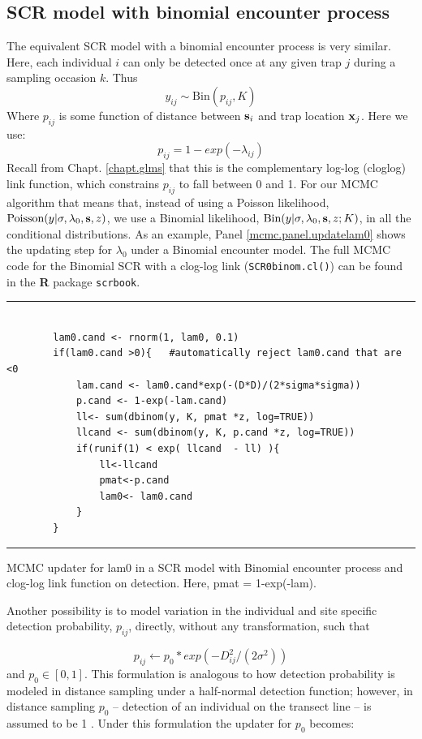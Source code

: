 \subsection{SCR model with binomial encounter process}
The equivalent SCR model with a binomial encounter process is very similar. Here, each individual $i$ can only be detected once at any given trap $j$ during a sampling occasion $k$.
Thus
\[
y_{ij} \sim \mbox{Bin} (p_{ij}, K)
\]
Where $p_{ij}$ is some function of distance between ${\bf s}_{i}$ and trap location ${\bf x}_{j}$. Here we use:
\[
p_{ij}=1-exp(-\lambda_{ij})
\]
Recall from Chapt. \ref{chapt.glms} that this is the complementary log-log (cloglog) link function, which constrains $p_{ij}$ 
to fall between 0 and 1.
For our MCMC algorithm that means that, instead of using a Poisson 
likelihood, $\mbox{Poisson}(y|\sigma,\lambda_0,{\bf s},z)$, we use a 
Binomial likelihood, $\mbox{Bin}(y| \sigma,\lambda_0,{\bf s},z; K)$, 
in all the conditional distributions. As an example, Panel
\ref{mcmc.panel.updatelam0} shows 
the updating step for $\lambda_0$ under a Binomial encounter model. 
The full MCMC code for the Binomial SCR with a clog-log link (\mbox{\tt SCR0binom.cl()}) 
can be found in the {\bf R} package \mbox{\tt scrbook}.


\begin{panel}[htp]
\centering
\rule[0.15in]{\textwidth}{.03in}
{\small
\begin{verbatim}

        lam0.cand <- rnorm(1, lam0, 0.1)
        if(lam0.cand >0){   #automatically reject lam0.cand that are <0
            lam.cand <- lam0.cand*exp(-(D*D)/(2*sigma*sigma))
            p.cand <- 1-exp(-lam.cand)
            ll<- sum(dbinom(y, K, pmat *z, log=TRUE))  
            llcand <- sum(dbinom(y, K, p.cand *z, log=TRUE))
            if(runif(1) < exp( llcand  - ll) ){
                ll<-llcand
                pmat<-p.cand
                lam0<- lam0.cand
            }
        }
\end{verbatim}
}
\rule[-0.15in]{\textwidth}{.03in}
\caption{
MCMC updater for lam0 in a SCR model with Binomial encounter
process and clog-log link function on detection. Here, pmat =
1-exp(-lam).
}
\label{mcmc.panel.updatelam0}
\end{panel}


Another possibility is to model variation in the individual and site 
specific detection probability,  $p_{ij}$, directly, without any 
transformation, such that

\[
p_{ij} \leftarrow p_0 * exp(-D_{ij}^2/(2\sigma^2))
\]
and $p_0 \in [0,1]$.
This formulation is analogous to how detection probability is modeled 
in distance sampling under a half-normal detection function; however, 
in distance sampling $p_0$ -- detection of an individual on the transect 
line -- is assumed to be 1 \citep{buckland_etal:2001}. Under this 
formulation the updater for $p_0$ becomes:


